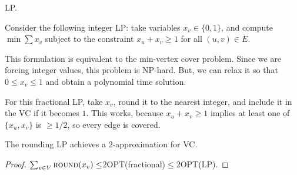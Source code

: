\begin{example}
\exlabel

LP.
\end{example}

Consider the following integer LP: take variables $x_v\in \{0,1\}$, and compute $\min \sum x_v$ subject to the constraint $x_u+x_v\geq 1$ for all $(u,v)\in E$. 

This formulation is equivalent to the min-vertex cover problem. Since we are forcing integer values, this problem is NP-hard. But, we can relax it so that $0\leq x_v\leq 1$ and obtain a polynomial time solution. 

For this fractional LP, take $x_v$, round it to the nearest integer, and include it in the VC if it becomes $1$. This works, because $x_u+x_v\geq 1$ implies at least one of $\{x_u, x_v\}$ is $\geq 1/2$, so every edge is covered. 

\begin{theorem}
\claimlabel

The rounding LP achieves a $2$-approximation for VC.
\end{theorem}

\begin{proof}
$\sum_{v\in V}\textsc{round}(x_v)\leq$2\textsc{OPT}(fractional)$\leq$2\textsc{OPT}(LP). 
\end{proof}